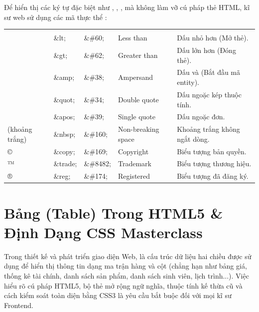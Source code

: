 Để hiển thị các ký tự đặc biệt như \codeinline{<}, \codeinline{>}, \codeinline{\&},  mà không làm vỡ cú pháp thẻ HTML, kĩ sư web sử dụng các mã thực thể :

\begin{prettyTableBox}
\begin{tabularx}{\linewidth}{C{1.5cm} K{2.2cm} K{2.2cm} L{3.5cm} Z}
 &  &  &  &  \\
\codeinline{<} & \&lt; & \&\#60; & Less than & Dấu nhỏ hơn (Mở thẻ). \\
\codeinline{>} & \&gt; & \&\#62; & Greater than & Dấu lớn hơn (Đóng thẻ). \\
\codeinline{\&} & \&amp; & \&\#38; & Ampersand & Dấu và (Bắt đầu mã entity). \\
 & \&quot; & \&\#34; & Double quote & Dấu ngoặc kép thuộc tính. \\
 & \&apos; & \&\#39; & Single quote & Dấu ngoặc đơn. \\
\small(khoảng trắng) & \&nbsp; & \&\#160; & Non-breaking space & Khoảng trắng không ngắt dòng. \\
© & \&copy; & \&\#169; & Copyright & Biểu tượng bản quyền. \\
™ & \&trade; & \&\#8482; & Trademark & Biểu tượng thương hiệu. \\
® & \&reg; & \&\#174; & Registered & Biểu tượng đã đăng ký. \\
\end{tabularx}
\end{prettyTableBox}

\Needspace*{80pt}
\section{Bảng (Table) Trong HTML5 \& Định Dạng CSS Masterclass}

Trong thiết kế và phát triển giao diện Web,  là cấu trúc dữ liệu hai chiều được sử dụng để hiển thị thông tin dạng ma trận hàng và cột (chẳng hạn như bảng giá, thống kê tài chính, danh sách sản phẩm, danh sách sinh viên, lịch trình...). Việc hiểu rõ cú pháp HTML5, bộ thẻ mở rộng ngữ nghĩa, thuộc tính kế thừa cũ và cách kiểm soát toàn diện bằng CSS3 là yêu cầu bắt buộc đối với mọi kĩ sư Frontend.

